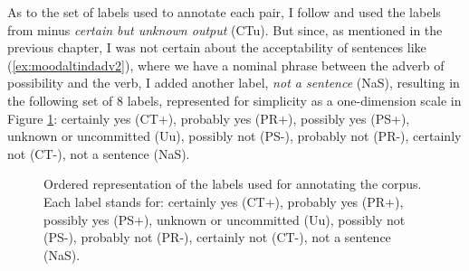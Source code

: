 \begin{exe}
  \label{ex:posbas}
  \label{ex:posind}
  \label{ex:possub}
\end{exe}

As to the set of labels used to annotate each pair, I follow \citet{de2012did} and used the labels from \citet{sauri2009factbank} minus \textit{certain but unknown output} (CTu). But since, as mentioned in the previous chapter, I was not certain about the acceptability of sentences like (\ref{ex:moodaltindadv2}), where we have a nominal phrase between the adverb of possibility and the verb, I added another label, \textit{not a sentence} (NaS), resulting in the following set of 8 labels, represented for simplicity as a one-dimension scale in Figure \ref{fig:labels}: certainly yes (CT+), probably yes (PR+), possibly yes (PS+), unknown or uncommitted (Uu), possibly not (PS-), probably not (PR-), certainly not (CT-), not a sentence (NaS).\\

\begin{figure}
\centering
{} 
\caption[Ordered labels for the pilot study.]{Ordered representation of the labels used for annotating the corpus. Each label stands for: certainly yes (CT+), probably yes (PR+), possibly yes (PS+), unknown or uncommitted (Uu), possibly not (PS-), probably not (PR-), certainly not (CT-), not a sentence (NaS).}\label{fig:labels}
\end{figure}


